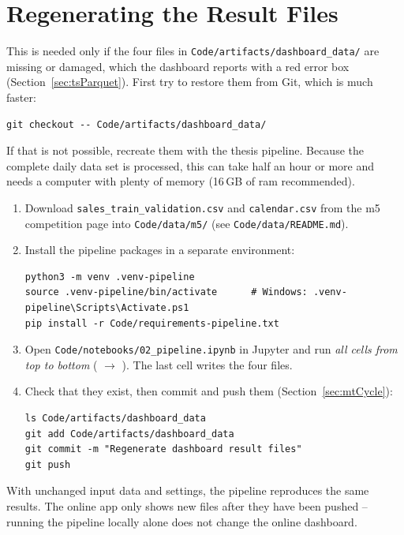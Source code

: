 \section{Regenerating the Result Files}
\label{sec:mtRegenerate}

This is needed only if the four files in \texttt{Code/artifacts/dashboard\_data/} are missing or damaged, which the dashboard reports with a red error box (Section~\ref{sec:tsParquet}). First try to restore them from Git, which is much faster:

\begin{lstlisting}[style=shell]
git checkout -- Code/artifacts/dashboard_data/
\end{lstlisting}

If that is not possible, recreate them with the thesis pipeline. Because the complete daily data set is processed, this can take half an hour or more and needs a computer with plenty of memory (16\,GB of \ac{ram} recommended).

\begin{enumerate}
  \item Download \texttt{sales\_train\_validation.csv} and \texttt{calendar.csv} from the \ac{m5} competition page \cite{Kaggle:M5} into \texttt{Code/data/m5/} (see \texttt{Code/data/README.md}).
  \item Install the pipeline packages in a separate environment:
\begin{lstlisting}[style=shell]
python3 -m venv .venv-pipeline
source .venv-pipeline/bin/activate      # Windows: .venv-pipeline\Scripts\Activate.ps1
pip install -r Code/requirements-pipeline.txt
\end{lstlisting}
  \item Open \texttt{Code/notebooks/02\_pipeline.ipynb} in Jupyter and run \emph{all cells from top to bottom} ( $\rightarrow$ ). The last cell writes the four files.
  \item Check that they exist, then commit and push them (Section~\ref{sec:mtCycle}):
\begin{lstlisting}[style=shell]
ls Code/artifacts/dashboard_data
git add Code/artifacts/dashboard_data
git commit -m "Regenerate dashboard result files"
git push
\end{lstlisting}
\end{enumerate}

\begin{NoteBox}
With unchanged input data and settings, the pipeline reproduces the same results. The online app only shows new files after they have been pushed -- running the pipeline locally alone does not change the online dashboard.
\end{NoteBox}

